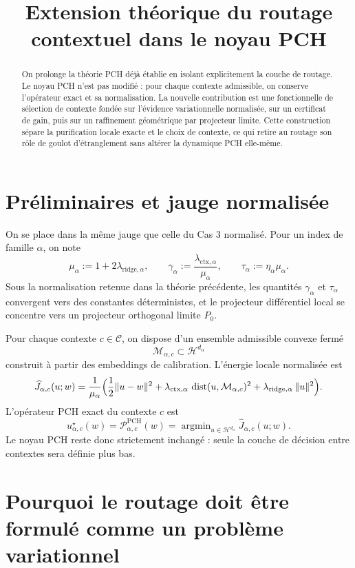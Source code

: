 \documentclass[11pt,a4paper]{article}
\title{Extension théorique du routage contextuel dans le noyau PCH}
\author{}
\date{}
\DeclareMathOperator{\argmin}{argmin}
\DeclareMathOperator{\dist}{dist}
\newcommand{\Hh}{\mathcal H}
\newcommand{\Mcal}{\mathcal M}
\newcommand{\Ccal}{\mathcal C}
\newcommand{\Pcal}{\mathcal P}
\begin{document}
\maketitle

\begin{abstract}
On prolonge la théorie PCH déjà établie en isolant explicitement la couche de routage.
Le noyau PCH n'est pas modifié : pour chaque contexte admissible, on conserve l'opérateur exact et sa normalisation.
La nouvelle contribution est une fonctionnelle de sélection de contexte fondée sur l'évidence variationnelle normalisée, sur un certificat de gain, puis sur un raffinement géométrique par projecteur limite.
Cette construction sépare la purification locale exacte et le choix de contexte, ce qui retire au routage son rôle de goulot d'étranglement sans altérer la dynamique PCH elle-même.
\end{abstract}

\section{Préliminaires et jauge normalisée}

On se place dans la même jauge que celle du Cas 3 normalisé.
Pour un index de famille $\alpha$, on note
\[
\mu_\alpha := 1+2\lambda_{\mathrm{ridge},\alpha},\qquad
\gamma_\alpha := \frac{\lambda_{\mathrm{ctx},\alpha}}{\mu_\alpha},\qquad
\tau_\alpha := \eta_\alpha \mu_\alpha.
\]
Sous la normalisation retenue dans la théorie précédente, les quantités $\gamma_\alpha$ et $\tau_\alpha$ convergent vers des constantes déterministes, et le projecteur différentiel local se concentre vers un projecteur orthogonal limite $P_0$.

Pour chaque contexte $c\in\Ccal$, on dispose d'un ensemble admissible convexe fermé
\[
\Mcal_{\alpha,c}\subset \Hh^{d_\alpha}
\]
construit à partir des embeddings de calibration.
L'énergie locale normalisée est
\[
\widehat J_{\alpha,c}(u;w)
=
\frac{1}{\mu_\alpha}
\Bigl(
\frac12\|u-w\|^2
+
\lambda_{\mathrm{ctx},\alpha}\,\dist(u,\Mcal_{\alpha,c})^2
+
\lambda_{\mathrm{ridge},\alpha}\,\|u\|^2
\Bigr).
\]
L'opérateur PCH exact du contexte $c$ est
\[
u^\star_{\alpha,c}(w)
=
\Pcal^{\mathrm{PCH}}_{\alpha,c}(w)
=
\argmin_{u\in \Hh^{d_\alpha}} \widehat J_{\alpha,c}(u;w).
\]
Le noyau PCH reste donc strictement inchangé : seule la couche de décision entre contextes sera définie plus bas.

\section{Pourquoi le routage doit être formulé comme un problème variationnel}
\end{document}
